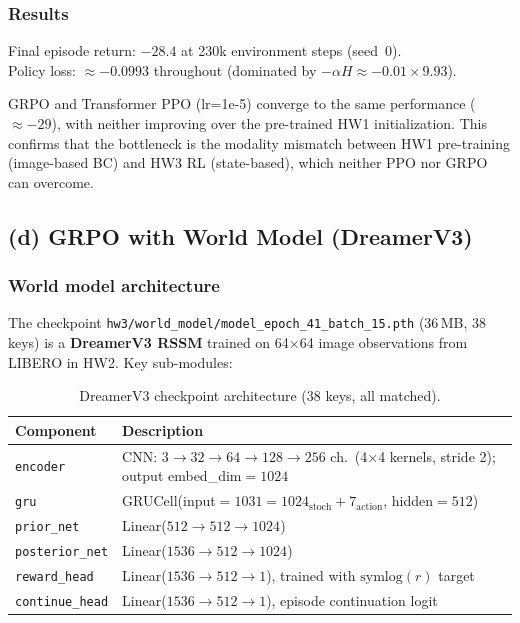 \documentclass[11pt,letterpaper]{article}
\begin{document}
\subsubsection{Results}

Final episode return: $\mathbf{-28.4}$ at 230k environment steps (seed~0).\\
Policy loss: $\approx -0.0993$ throughout (dominated by $-\alpha H \approx -0.01 \times 9.93$).

GRPO and Transformer PPO (lr=1e-5) converge to the same performance ($\approx -29$), with neither improving over the pre-trained HW1 initialization. This confirms that the bottleneck is the modality mismatch between HW1 pre-training (image-based BC) and HW3 RL (state-based), which neither PPO nor GRPO can overcome.

\subsection{(d) GRPO with World Model (DreamerV3)}

\subsubsection{World model architecture}

The checkpoint \texttt{hw3/world\_model/model\_epoch\_41\_batch\_15.pth} (36\,MB, 38 keys) is a \textbf{DreamerV3 RSSM} trained on 64$\times$64 image observations from LIBERO in HW2. Key sub-modules:

\begin{table}[h]
\centering
\begin{tabular}{ll}
\toprule
Component & Description \\
\midrule
\texttt{encoder} & CNN: $3{\to}32{\to}64{\to}128{\to}256$ ch.\ (4$\times$4 kernels, stride 2); output embed\_dim$=1024$ \\
\texttt{gru} & GRUCell(input$=1031=1024_\text{stoch}+7_\text{action}$, hidden$=512$) \\
\texttt{prior\_net} & Linear($512{\to}512{\to}1024$) \\
\texttt{posterior\_net} & Linear($1536{\to}512{\to}1024$) \\
\texttt{reward\_head} & Linear($1536{\to}512{\to}1$), trained with $\text{symlog}(r)$ target \\
\texttt{continue\_head} & Linear($1536{\to}512{\to}1$), episode continuation logit \\
\bottomrule
\end{tabular}
\caption{DreamerV3 checkpoint architecture (38 keys, all matched).}
\end{table}
\end{document}
